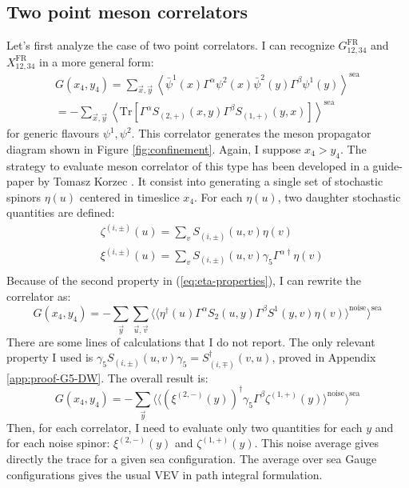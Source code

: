 \documentclass[english, LaM, oneside, noexaminfo]{sapthesis}
\newcommand{\la}{\langle}
\newcommand{\ra}{\rangle}
\newcommand{\tr}{\text{Tr}}
\begin{document}
\subsection*{Two point meson correlators}
\noindent
Let's first analyze the case of two point correlators.
I can recognize $G^\text{FR}_{12,34}$ and $X^\text{FR}_{12,34}$ in a more general form:
\begin{equation}\label{eq:2pts-correlator-prototype}
    \begin{gathered}
        G(x_4,y_4) = \sum_{\vec x, \vec y} \left\la \bar\psi^1 (x) \Gamma^\alpha \psi^2 (x) \bar\psi^2 (y) \Gamma^\beta \psi^1 (y) \right\ra^\text{sea} \\
        = -  \sum_{\vec x, \vec y} \left\la \tr \left[ \Gamma^\alpha S_{(2,+)} (x,y) \Gamma^\beta S_{(1,+)} (y,x) \right] \right\ra^\text{sea}
    \end{gathered}
\end{equation}
for generic flavours $\psi^1, \psi^2$.
This correlator generates the meson propagator diagram shown in Figure \ref{fig:confinement}.
Again, I suppose $x_4 > y_4$.
The strategy to evaluate meson correlator of this type has been developed in a guide-paper by Tomasz Korzec \cite{korzec}.
It consist into generating a single set of stochastic spinors $\eta (u)$ centered in timeslice $x_4$.
For each $\eta (u)$, two daughter stochastic quantities are defined:
\begin{equation*}
    \begin{split}
        & \zeta^{(i,\pm)} (u) = \sum_v S_{(i,\pm)}(u,v) \eta (v) \\
        & \xi^{(i,\pm)} (u) = \sum_v S_{(i,\pm)}(u,v) \gamma_5 \Gamma^{\alpha\dag} \eta (v) \\
    \end{split}
\end{equation*}
Because of the second property in (\ref{eq:eta-properties}), I can rewrite the correlator as:
\begin{equation*}
    G(x_4,y_4) = -\sum_{\vec y} \sum_{\vec u, \vec v}  \bigg\langle \Big\langle \eta^\dag(u) \Gamma^\alpha S_2 (u,y) \Gamma^\beta S^1 (y,v) \eta(v) \Big\rangle^\text{noise} \bigg\rangle^{\text{sea}} 
\end{equation*}
There are some lines of calculations that I do not report.
The only relevant property I used is $\gamma_5 S_{(i,\pm)} (u,v) \gamma_5 = S_{(i,\mp)}^\dag (v,u)$, proved in Appendix \ref{app:proof-G5-DW}.
The overall result is:
\begin{equation*}
    G(x_4,y_4) = -\sum_{\vec y} \Bigg\langle \bigg\langle \left(\xi^{(2,-)}(y)\right)^\dag \gamma_5 \Gamma^\beta \zeta^{(1,+)}(y) \bigg\rangle^\text{noise} \Bigg\rangle^{\text{sea}} 
\end{equation*}
Then, for each correlator, I need to evaluate only two quantities for each $y$ and for each noise spinor: $\xi^{(2,-)}(y)$ and $\zeta^{(1,+)}(y)$.
This noise average gives directly the trace for a given sea configuration.
The average over sea Gauge configurations gives the usual VEV in path integral formulation.
\end{document}
